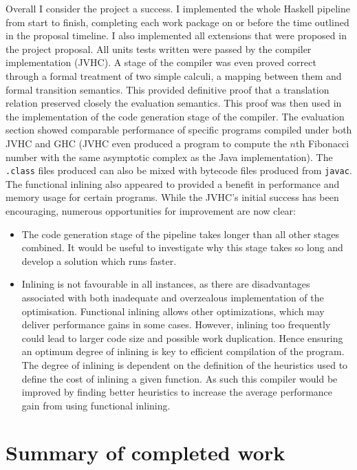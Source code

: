 \documentclass[float=false, crop=false]{standalone}
\begin{document}
Overall I consider the project a success. I implemented the whole Haskell
pipeline from start to finish, completing each work package on or
before the time outlined in the proposal timeline. I also implemented
all extensions that were proposed in the project proposal. 
All units tests written were passed by the compiler implementation (JVHC). 
A stage of the compiler was even proved correct through
a formal treatment of two simple calculi, a mapping between them
and formal transition semantics. This provided definitive proof that a translation
relation preserved closely the evaluation semantics. This proof was then 
used in the implementation of the code generation stage of the compiler.
The evaluation section showed comparable performance of specific programs
compiled under both JVHC and GHC (JVHC even produced a program to compute
the $n$th Fibonacci number with the same asymptotic complex as the Java
implementation). The \verb|.class| files produced can also be mixed with 
bytecode files produced from \verb|javac|. The functional inlining also
appeared  to provided a benefit in performance and memory usage for certain
programs. 
While the JVHC’s initial success has been encouraging, numerous opportunities for improvement are now clear:
\begin{itemize}

\item The code generation stage of the pipeline takes longer than all other stages 
combined. It would be useful to investigate why this stage takes so long 
and develop a solution which runs faster.

\item Inlining is not favourable in all instances, as there are disadvantages associated with both inadequate and overzealous implementation of the optimisation.  Functional inlining allows other optimizations, which may deliver performance gains in some cases. However, inlining too frequently could lead to larger code size and possible work duplication. Hence ensuring an optimum degree of inlining is key to efficient compilation of the program. The degree of inlining is dependent on the definition of the heuristics used to define the cost of inlining a given function. As such this compiler would be improved by finding better heuristics to increase the average performance gain from using functional inlining.
\end{itemize}


\section{Summary of completed work}
\end{document}
